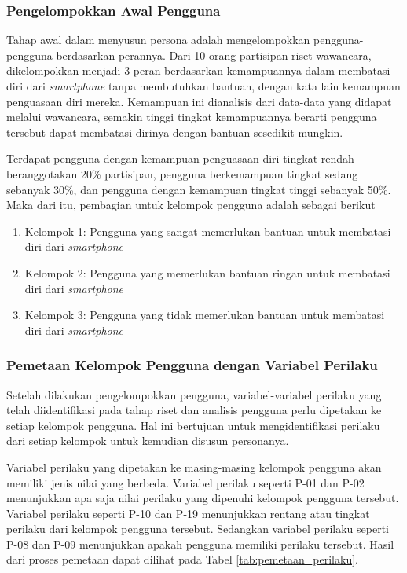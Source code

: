 \subsubsection{Pengelompokkan Awal Pengguna}
Tahap awal dalam menyusun persona adalah mengelompokkan pengguna-pengguna berdasarkan perannya. Dari 10 orang partisipan riset wawancara, dikelompokkan menjadi 3 peran berdasarkan kemampuannya dalam membatasi diri dari \textit{smartphone} tanpa membutuhkan bantuan, dengan kata lain kemampuan penguasaan diri mereka. Kemampuan ini dianalisis dari data-data yang didapat melalui wawancara, semakin tinggi tingkat kemampuannya berarti pengguna tersebut dapat membatasi dirinya dengan bantuan sesedikit mungkin.

Terdapat pengguna dengan kemampuan penguasaan diri tingkat rendah beranggotakan 20\% partisipan, pengguna berkemampuan tingkat sedang sebanyak 30\%, dan pengguna dengan kemampuan tingkat tinggi sebanyak 50\%. Maka dari itu, pembagian untuk kelompok pengguna adalah sebagai berikut\begin{enumerate}
  \item Kelompok 1: Pengguna yang sangat memerlukan bantuan untuk membatasi diri dari \textit{smartphone} 
  \item Kelompok 2: Pengguna yang memerlukan bantuan ringan untuk membatasi diri dari \textit{smartphone}
  \item Kelompok 3: Pengguna yang tidak memerlukan bantuan untuk membatasi diri dari \textit{smartphone}
\end{enumerate}

\subsubsection{Pemetaan Kelompok Pengguna dengan Variabel Perilaku}
Setelah dilakukan pengelompokkan pengguna, variabel-variabel perilaku yang telah diidentifikasi pada tahap riset dan analisis pengguna perlu dipetakan ke setiap kelompok pengguna. Hal ini bertujuan untuk mengidentifikasi perilaku dari setiap kelompok untuk kemudian disusun personanya.

Variabel perilaku yang dipetakan ke masing-masing kelompok pengguna akan memiliki jenis nilai yang berbeda. Variabel perilaku seperti P-01 dan P-02 menunjukkan apa saja nilai perilaku yang dipenuhi kelompok pengguna tersebut. Variabel perilaku seperti P-10 dan P-19 menunjukkan rentang atau tingkat perilaku dari kelompok pengguna tersebut. Sedangkan variabel perilaku seperti P-08 dan P-09 menunjukkan apakah pengguna memiliki perilaku tersebut. Hasil dari proses pemetaan dapat dilihat pada Tabel \ref{tab:pemetaan_perilaku}.

